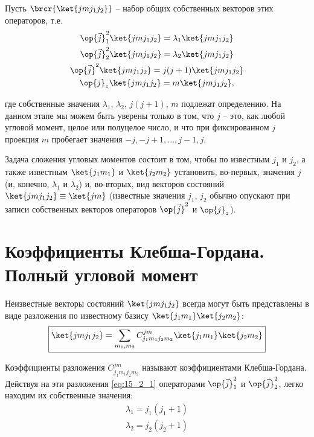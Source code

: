 Пусть $\brcr{\ket{j m j_1 j_2}}$ -- набор общих собственных векторов этих операторов, т.е.
\begin{gather*}
\op{\vec{j}}_1^2\ket{j m j_1 j_2} = \lambda_1 \ket{j m j_1 j_2}  \\
\op{\vec{j}}_2^2\ket{j m j_1 j_2} = \lambda_2 \ket{j m j_1 j_2}  \\
\op{\vec{j}}^2\ket{j m j_1 j_2} = j(j+1) \ket{j m j_1 j_2}  \\
\op{j}_{z} \ket{j m j_1 j_2} = m \ket{j m j_1 j_2}, 
\end{gather*}

где собственные значения $\lambda_1$, $\lambda_2$, $j(j+1)$, $m$ подлежат определению. На данном этапе мы можем быть уверены только в том, что $j$ -- это, как любой угловой момент, целое или полуцелое число, и что при фиксированном $j$ проекция $m$ пробегает значения $-j, -j + 1, ... , j - 1, j$.

Задача сложения угловых моментов состоит в том, чтобы по известным $j_1$ и $j_2$, а также известным $\ket{j_1 m_1}$ и $\ket{j_2 m_2}$ установить, во-первых, значения $j$ (и, конечно, $\lambda_1$ и $\lambda_2$) и, во-вторых, вид векторов состояний $\ket{j m j_1 j_2} \equiv \ket{j m}$ (известные значения $j_1$, $j_2$ обычно опускают при записи собственных векторов операторов $\op{\vec{j}}^2$ и $\op{j}_{z}$).

\begin{sloppypar}
\section{Коэффициенты Клебша-Гордана. Полный угловой момент}
\end{sloppypar}

Неизвестные векторы состояний $\ket{j m j_1 j_2}$ всегда могут быть представлены в виде разложения по известному базису $\ket{j_1 m_1} \ket{j_2 m_2}$:
\begin{equation}
\label{eq:15_2_1}
\boxed{\ket{j m j_1 j_2} = \sum_{m_1, m_2} C^{j m}_{j_1 m_1 j_2 m_2} \ket{j_1 m_1}\ket{j_2 m_2}}
\end{equation}

Коэффициенты разложения $C^{j m}_{j_1 m_1 j_2 m_2}$ называют коэффициентами Клебша-Гордана. Действуя на эти разложения \eqref{eq:15_2_1} операторами $\op{\vec{j}}_1^2$ и $\op{\vec{j}}_2^2$, легко находим их собственные значения:
\begin{gather*}
\lambda_1 = j_1(j_1 + 1) \\
\lambda_2 = j_2(j_2 + 1)
\end{gather*}

